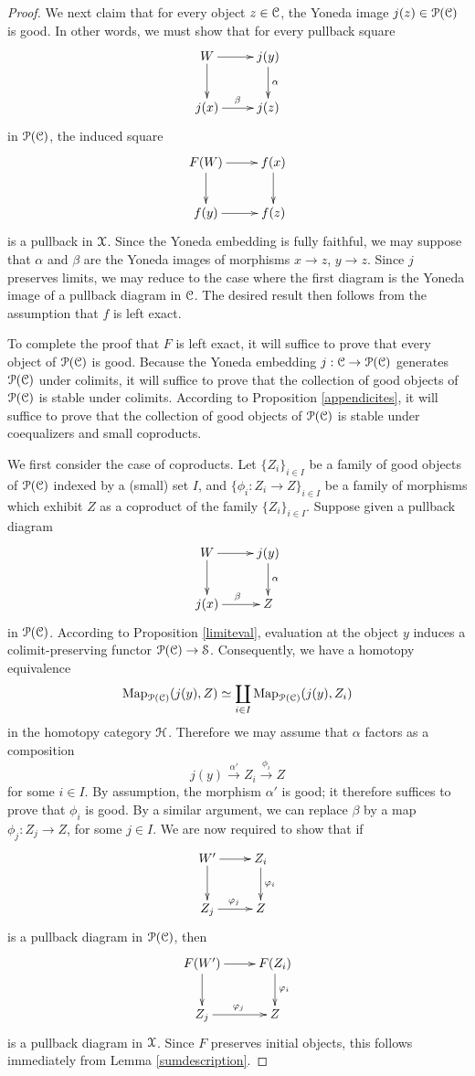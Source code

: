 \begin{proof}
We next claim that for every object $z \in \operatorname{\mathcal{C}}$, the Yoneda image $j(z) \in \operatorname{\mathcal{P}}(\operatorname{\mathcal{C}})$ is good.
In other words, we must show that for every pullback square
$$ \xymatrix{ W \ar[r] \ar[d] & j(y) \ar[d]^{\alpha} \\
j(x) \ar[r]^{\beta} & j(z) }$$
in $\operatorname{\mathcal{P}}(\operatorname{\mathcal{C}})$, the induced square
$$ \xymatrix{ F(W) \ar[r] \ar[d] & f(x) \ar[d] \\
f(y) \ar[r] & f(z)} $$
is a pullback in $\operatorname{\mathcal{X}}$. Since the Yoneda embedding is fully faithful, we may suppose
that $\alpha$ and $\beta$ are the Yoneda images of morphisms $x \rightarrow z$,
$y \rightarrow z$. Since $j$ preserves limits, we may reduce to the case where the first
diagram is the Yoneda image of a pullback diagram in $\operatorname{\mathcal{C}}$. The desired result then follows from the assumption that $f$ is left exact.

To complete the proof that $F$ is left exact, it will suffice to prove that every object
of $\operatorname{\mathcal{P}}(\operatorname{\mathcal{C}})$ is good. Because the Yoneda embedding $j: \operatorname{\mathcal{C}} \rightarrow \operatorname{\mathcal{P}}(\operatorname{\mathcal{C}})$
generates $\operatorname{\mathcal{P}}(\operatorname{\mathcal{C}})$ under colimits, it will suffice to prove that the collection of good objects of $\operatorname{\mathcal{P}}(\operatorname{\mathcal{C}})$ is stable under colimits. According to Proposition \ref{appendicites}, it will suffice to prove that the collection of good objects of $\operatorname{\mathcal{P}}(\operatorname{\mathcal{C}})$ is stable under coequalizers and small coproducts. 

We first consider the case of coproducts. Let $\{ Z_{i} \}_{i \in I}$ be a family of good objects
of $\operatorname{\mathcal{P}}(\operatorname{\mathcal{C}})$ indexed by a (small) set $I$, and $\{ \phi_i: Z_i \rightarrow Z\}_{i \in I}$ be a family
of morphisms which exhibit $Z$ as a coproduct of the family $\{ Z_i \}_{i \in I}$.
Suppose given a pullback diagram
$$ \xymatrix{ W \ar[r] \ar[d] & j(y) \ar[d]^{\alpha} \\
j(x) \ar[r]^{\beta} & Z }$$
in $\operatorname{\mathcal{P}}(\operatorname{\mathcal{C}})$. According to Proposition \ref{limiteval}, evaluation at the object
$y$ induces a colimit-preserving functor $\operatorname{\mathcal{P}}(\operatorname{\mathcal{C}}) \rightarrow \operatorname{\mathcal{S}}$. Consequently,
we have a homotopy equivalence
$$ \operatorname{{Map}}_{\operatorname{\mathcal{P}}(\operatorname{\mathcal{C}})}( j(y), Z ) \simeq 
\coprod_{i \in I} \operatorname{{Map}}_{\operatorname{\mathcal{P}}(\operatorname{\mathcal{C}})}( j(y), Z_i) $$
in the homotopy category $\operatorname{\mathcal{H}}$. Therefore we may assume that
$\alpha$ factors as a composition
$$ j(y) \stackrel{\alpha'}{\rightarrow} Z_i \stackrel{\phi_i}{\rightarrow} Z$$
for some $i \in I$. By assumption, the morphism $\alpha'$ is good; it therefore suffices
to prove that $\phi_i$ is good. By a similar argument, we can replace
$\beta$ by a map $\phi_j: Z_j \rightarrow Z$, for some $j \in I$. We are now required to show
that if $$ \xymatrix{ W' \ar[r] \ar[d] & Z_i \ar[d]^{\phi_i} \\
Z_j \ar[r]^{\phi_j} & Z }$$ is a pullback diagram in $\operatorname{\mathcal{P}}(\operatorname{\mathcal{C}})$, then
$$ \xymatrix{ F(W') \ar[r] \ar[d] & F(Z_i) \ar[d]^{\phi_i} \\
Z_j \ar[r]^{\phi_j} & Z }$$
is a pullback diagram in $\operatorname{\mathcal{X}}$. Since $F$ preserves initial objects, this follows immediately
from Lemma \ref{sumdescription}.


\end{proof}
